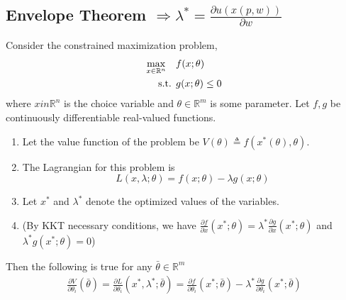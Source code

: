 \documentclass[11pt]{elegantbook}
\begin{document}
\subsection{Envelope Theorem $\Rightarrow \lambda^{*}=\frac{\partial u(x(p, w))}{\partial w}$}
\begin{theorem}
    Consider the constrained maximization problem,
    \begin{equation}
        \begin{aligned}
            \max_{x\in \mathbb{R}^n}\quad & f(x;\theta)\\
            \textnormal{s.t. }& g(x;\theta)\leq 0
        \end{aligned}
        \nonumber
    \end{equation}
    where $xin \mathbb{R}^n$ is the choice variable and $\theta\in \mathbb{R}^m$ is some parameter. Let $f,g$ be continuously differentiable real-valued functions.
    \begin{enumerate}[$\bullet$]
        \item Let the value function of the problem be $V(\theta)\triangleq f(x^*(\theta),\theta)$.
        \item The Lagrangian for this problem is $$L(x,\lambda;\theta)=f(x; \theta)-\lambda g(x; \theta)$$
        \item Let $x^{*}$ and $\lambda^{*}$ denote the optimized values of the variables.
        \item[](By KKT necessary conditions, we have $\frac{\partial f}{\partial x}(x^*;\theta)=\lambda^* \frac{\partial g}{\partial x}(x^*;\theta)$ and $\lambda^* g(x^*;\theta)=0$)
    \end{enumerate}
    Then the following is true for any $\bar{\theta}\in \mathbb{R}^m$
    \begin{equation}
        \begin{aligned}
            \frac{\partial V}{\partial \theta_i}(\bar{\theta})=\frac{\partial L}{\partial \theta_i}(x^{*}, \lambda^{*};\bar{\theta})=\frac{\partial f}{\partial \theta_i}(x^{*};\bar{\theta})-\lambda^*\frac{\partial g}{\partial \theta_i}(x^{*};\bar{\theta})
        \end{aligned}
        \nonumber
    \end{equation}
\end{theorem}
\end{document}
